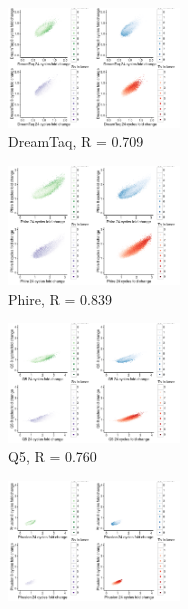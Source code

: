 \documentclass[parskip=full, numbers=noenddot]{scrreprt}
\begin{document}
\begin{figure}[htb]
  \centering
  \begin{subfigure}[htb]{0.5\textwidth}
    \centering
    \includegraphics[width=0.5\textwidth]{kmer_dreamtaq}
    \caption{DreamTaq, R = 0.709}
    \label{fig:kmer_enz_dreamtaq}
  \end{subfigure}
  \begin{subfigure}[htb]{0.5\textwidth}
    \centering
    \includegraphics[width=0.5\textwidth]{kmer_phire}
    \caption{Phire, R = 0.839}
    \label{fig:kmer_enz_phire}
  \end{subfigure}
  \begin{subfigure}[htb]{0.5\textwidth}
    \centering
    \includegraphics[width=0.5\textwidth]{kmer_q5}
    \caption{Q5, R = 0.760}
    \label{fig:kmer_enz_q5}
  \end{subfigure}
  \begin{subfigure}[htb]{0.5\textwidth}
    \centering
    \includegraphics[width=0.5\textwidth]{kmer_phusion}

\end{subfigure}
\end{figure}
\end{document}
